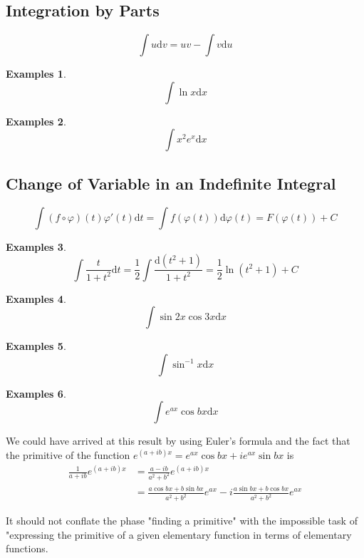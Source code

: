\documentclass[a4paper,12pt]{article} %
\newtheorem{example}{Examples}
\begin{document}
\subsection{Integration by Parts}

\[
    \int u\mathrm{d}v = uv - \int v\mathrm{d}u
    \]
\begin{example}
    \[
        \int \ln x \mathrm{d}x
        \]
\end{example}
\begin{example}
    \[
        \int x^2e^x\mathrm{d}x
        \]
\end{example}

\subsection{Change of Variable in an Indefinite Integral}
\[
    \int \left(f\circ\varphi\right)(t)\varphi'(t)\mathrm{d}t = \int f(\varphi(t))\mathrm{d}\varphi(t) = 
    F(\varphi(t)) + C
    \]

\begin{example}
    \[
        \int \frac{t}{1+t^2}\mathrm{d}t = \frac{1}{2}\int \frac{\mathrm{d}(t^2 + 1)}{1+t^2}
        = \frac{1}{2}\ln (t^2 + 1) + C
        \]
\end{example}

\begin{example}
    \[
        \int \sin 2x \cos 3x \mathrm{d}x
        \]
\end{example}

\begin{example}
    \[
    \int \sin^{-1}x \mathrm{d}x
    \]
\end{example}

\begin{example}
    \[
    \int e^{ax} \cos bx \mathrm{d}x
    \]
\end{example}

We could have arrived at this result by using Euler's formula and the
fact that the primitive of the function $e^{(a+ib)x} = e^{ax}\cos bx + ie^{ax}\sin bx$ 
is 
\[
    \begin{split}
        \frac{1}{a+ib}e^{(a+ib)x}  & = \frac{a-ib}{a^2 + b^2}e^{(a+ib)x} \\
        & = \frac{a\cos bx + b\sin bx}{a^2 + b^2}e^{ax} - 
            i\frac{a\sin bx + b\cos bx}{a^2 + b^2}e^{ax}
    \end{split}
            \]

It should not conflate the phase "finding a primitive" with the impossible 
task of "expressing the primitive of a given elementary function in 
terms of elementary functions.
\end{document}
